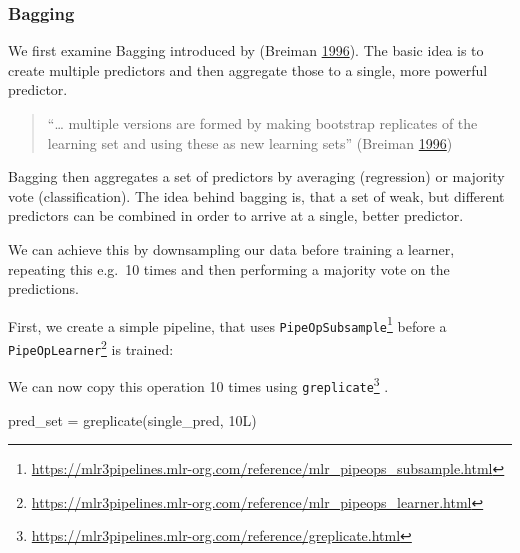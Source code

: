 \documentclass[12pt,]{scrbook}
\newenvironment{Shaded}{}{}
\newcommand{\DataTypeTok}[1]{#1}
\newcommand{\FloatTok}[1]{#1}
\newcommand{\KeywordTok}[1]{\textcolor[rgb]{0.00,0.00,1.00}{#1}}
\newcommand{\NormalTok}[1]{#1}
\newcommand{\OperatorTok}[1]{#1}
\newcommand{\StringTok}[1]{\textcolor[rgb]{0.00,0.50,0.50}{#1}}
\renewcommand{\href}[2]{#2\footnote{\url{#1}}}
\begin{document}
\hypertarget{pipe-model-ensembles-bagging}{%
\subsubsection{Bagging}\label{pipe-model-ensembles-bagging}}

We first examine Bagging introduced by (Breiman \protect\hyperlink{ref-Breiman1996}{1996}).
The basic idea is to create multiple predictors and then aggregate those to a single, more powerful predictor.

\begin{quote}
``\ldots{} multiple versions are formed
by making bootstrap replicates of the learning set
and using these as new learning sets'' (Breiman \protect\hyperlink{ref-Breiman1996}{1996})
\end{quote}

Bagging then aggregates a set of predictors by averaging (regression) or majority vote (classification).
The idea behind bagging is, that a set of weak, but different predictors can be combined in order to arrive at a single, better predictor.

We can achieve this by downsampling our data before training a learner, repeating this e.g.~10 times and then performing a majority vote on the predictions.

First, we create a simple pipeline, that uses \href{https://mlr3pipelines.mlr-org.com/reference/mlr_pipeops_subsample.html}{\texttt{PipeOpSubsample}} before a \href{https://mlr3pipelines.mlr-org.com/reference/mlr_pipeops_learner.html}{\texttt{PipeOpLearner}} is trained:

\begin{Shaded}
\end{Shaded}

We can now copy this operation 10 times using \href{https://mlr3pipelines.mlr-org.com/reference/greplicate.html}{\texttt{greplicate}} .

\begin{Shaded}
\begin{Highlighting}[]
\NormalTok{pred_set =}\StringTok{ }\KeywordTok{greplicate}\NormalTok{(single_pred, 10L)}
\end{Highlighting}
\end{Shaded}
\end{document}
